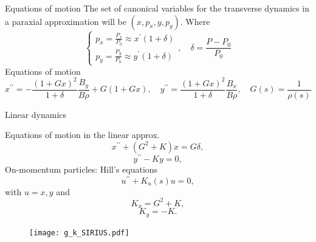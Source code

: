 \documentclass[aspectratio=169]{beamer}
\begin{document}
\begin{frame}{Equations of motion}
The set of canonical variables for the transverse dynamics in a paraxial approximation will be $(x,p_{x},y , p_{y})$. Where
$$\begin{cases} p_{x}=\frac{P_x}{P_0}\approx x^\prime(1+\delta)\\p_{y}=\frac{P_y}{P_0}\approx y^\prime (1+\delta)\end{cases},  \quad \delta = \frac{P-P_{0}}{P_{0}}$$
\pause
Equations of motion
$$
x^{\prime \prime}=-\frac{(1+G x)^{2}}{1+\delta} \frac{B_{y}}{B \rho}+G(1+G x),
\quad
y^{\prime \prime}=\frac{(1+G x)^{2}}{1+\delta} \frac{B_{x}}{B \rho}, \quad G(s) = \frac{1}{\rho(s)}
$$
\end{frame}
\begin{frame}{Linear dynamics}
\begin{minipage}{0.49\textwidth}
    Equations of motion in the linear approx.
    \begin{equation*}
        x^{\prime\prime}+(G^2+K)x=G\delta,
    \end{equation*}
    \begin{equation*}
        y^{\prime\prime}-Ky=0,
    \end{equation*}
    \pause
    On-momentum particles: Hill's equations
    \begin{equation*}
        u^{\prime\prime}+K_u(s)u = 0,
    \end{equation*}
    \pause
    with $u=x,y$ and
    $$K_x = G^2 + K,$$ $$K_y = - K.$$
\end{minipage}
\hfill
\pause
\begin{minipage}{0.49\textwidth}
    \begin{figure}
        \centering
        \texttt{[image: g\_k\_SIRIUS.pdf]}
    \end{figure}
\end{minipage}
\end{frame}
\end{document}
